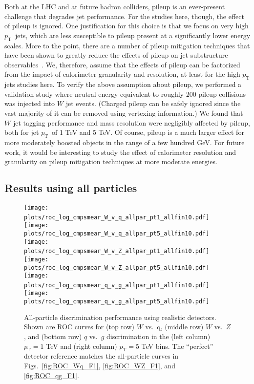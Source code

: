 \documentclass[11pt,letterpaper]{article}
\DeclareRobustCommand{\Figss}[3]{Figs.~\ref{#1}, \ref{#2}, and \ref{#3}}
\newcommand{\pt}{p_{\mathrm{T}}}
\begin{document}
Both at the LHC and at future hadron colliders, pileup is an ever-present challenge that degrades jet performance.
%
For the studies here, though, the effect of pileup is ignored.
%
One justification for this choice is that we focus on very high $\pt$~jets, which are less susceptible to pileup present at a significantly lower energy scales.
%
More to the point, there are a number of pileup mitigation techniques that have been shown to greatly reduce the effects of pileup on jet substructure observables~\cite{Krohn:2013lba,puppi,softkiller,shapesub,Komiske:2017ubm}.
%
We, therefore, assume that the effects of pileup can be factorized from the impact of calorimeter granularity and resolution, at least for the high $\pt$ jets studies here.
%
To verify the above assumption about pileup, we performed a validation study where neutral energy equivalent to roughly 200 pileup collisions was injected into $W$ jet events.  
%
(Charged pileup can be safely ignored since the vast majority of it can be removed using vertexing information.) 
%
We found that $W$ jet tagging performance and mass resolution were negligibly affected by pileup, both for jet $\pt$~of 1 TeV and 5 TeV.
%
Of course, pileup is a much larger effect for more moderately boosted objects in the range of a few hundred GeV.
%
For future work, it would be interesting to study the effect of calorimeter resolution and granularity on pileup mitigation techniques at more moderate energies.

\subsection{Results using all particles}
\label{sec:results:all}

\begin{figure}
\begin{center}
\texttt{[image: plots/roc\_log\_cmpsmear\_W\_v\_q\_allpar\_pt1\_allfin10.pdf]}
$\qquad$
\texttt{[image: plots/roc\_log\_cmpsmear\_W\_v\_q\_allpar\_pt5\_allfin10.pdf]}\\
\texttt{[image: plots/roc\_log\_cmpsmear\_W\_v\_Z\_allpar\_pt1\_allfin10.pdf]}
$\qquad$
\texttt{[image: plots/roc\_log\_cmpsmear\_W\_v\_Z\_allpar\_pt5\_allfin10.pdf]}\\
\texttt{[image: plots/roc\_log\_cmpsmear\_q\_v\_g\_allpar\_pt1\_allfin10.pdf]}
$\qquad$
\texttt{[image: plots/roc\_log\_cmpsmear\_q\_v\_g\_allpar\_pt5\_allfin10.pdf]}
\end{center}
\caption{All-particle discrimination performance using realistic detectors.  Shown are ROC curves for (top row) $W$ vs.~q, (middle row) $W$ vs.~$Z$, and (bottom row) $q$ vs.~$g$ discrimination in the (left column) $\pt=1$ TeV and (right column) $\pt=5$ TeV bins.  The ``perfect'' detector reference matches the all-particle curves in \Figss{fig:ROC_Wq_F1}{fig:ROC_WZ_F1}{fig:ROC_qg_F1}.}
\label{fig:ROC_DetectorComparison_detectors}
\end{figure}
\end{document}
